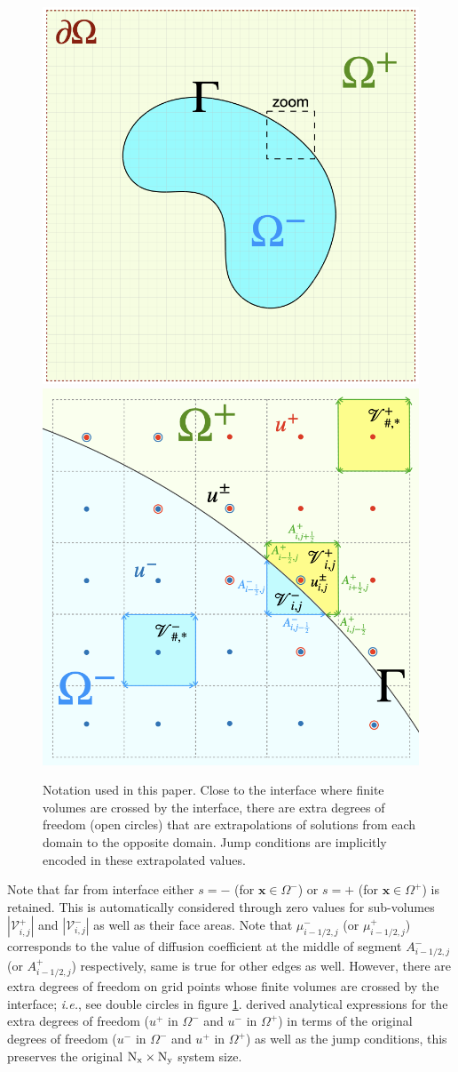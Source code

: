 \documentclass{elsarticle}
\begin{document}
\begin{figure}
	\centering
	\includegraphics[width=0.45\linewidth]{./figures/grids_full.png}
	\includegraphics[width=0.45\linewidth]{./figures/grids.png}
	\caption{Notation used in this paper. Close to the interface where finite volumes are crossed by the interface, there are extra degrees of freedom (open circles) that are extrapolations of solutions from each domain to the opposite domain. Jump conditions are implicitly encoded in these extrapolated values.}
	\label{fig:grid}
\end{figure}

Note that far from interface either $s=-$ (for $\mathbf{x}\in \Omega^-$) or $s=+$ (for $\mathbf{x}\in \Omega^+$) is retained. This is automatically considered through zero values for sub-volumes $|\mathcal{V}_{i,j}^+|$ and $|\mathcal{V}_{i,j}^-|$ as well as their face areas. Note that $\mu_{i-1/2,j}^-$ (or $\mu_{i-1/2,j}^+$) corresponds to the value of diffusion coefficient at the middle of segment $A^-_{i-1/2,j}$ (or $A^+_{i-1/2,j}$) respectively, same is true for other edges as well. However, there are extra degrees of freedom on grid points whose finite volumes are crossed by the interface; \textit{i.e.}, see double circles in figure \ref{fig:grid}. \cite{bochkov2020solving} derived analytical expressions for the extra degrees of freedom ($u^+$ in $\Omega^-$ and $u^-$ in $\Omega^+$) in terms of the original degrees of freedom ($u^-$ in $\Omega^-$ and $u^+$ in $\Omega^+$) as well as the jump conditions, this preserves the original $\rm N_x \times N_y$ system size.
\end{document}
